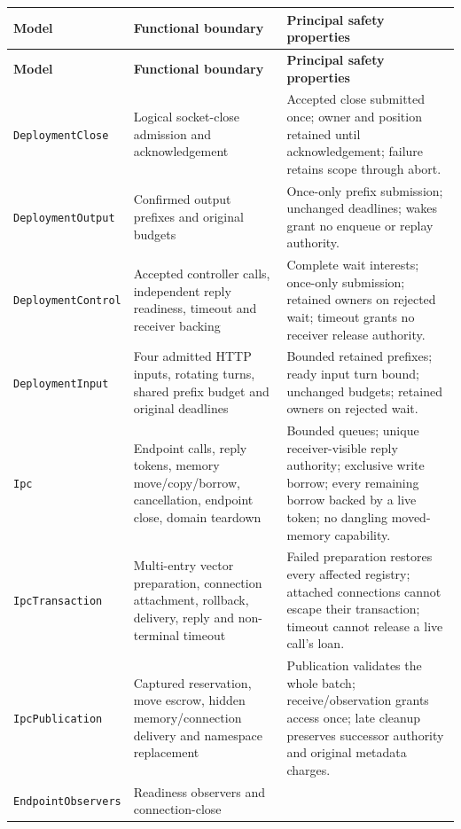 \small
\begin{longtable}{|p{}|p{}|p{}|}
\hline
\textbf{Model} & \textbf{Functional boundary} & \textbf{Principal safety properties} \\
\hline
\endfirsthead
\hline
\textbf{Model} & \textbf{Functional boundary} & \textbf{Principal safety properties} \\
\hline
\endhead
\texttt{DeploymentClose} & Logical socket-close admission and
    acknowledgement & Accepted close submitted once; owner and position retained
    until acknowledgement; failure retains scope through abort. \\
\hline
\texttt{DeploymentOutput} & Confirmed output prefixes and original
    budgets & Once-only prefix submission; unchanged deadlines; wakes grant no
    enqueue or replay authority. \\
\hline
\texttt{DeploymentControl} & Accepted controller calls, independent
    reply readiness, timeout and receiver backing & Complete wait interests;
    once-only submission; retained owners on rejected wait; timeout grants no
    receiver release authority. \\
\hline
\texttt{DeploymentInput} & Four admitted HTTP inputs, rotating
    turns, shared prefix budget and original deadlines & Bounded retained
    prefixes; ready input turn bound; unchanged budgets; retained owners on
    rejected wait. \\
\hline
\texttt{Ipc} & Endpoint calls, reply tokens, memory move/copy/borrow,
    cancellation, endpoint close, domain teardown & Bounded queues; unique
    receiver-visible reply authority; exclusive write borrow; every remaining
    borrow backed by a live token; no dangling moved-memory capability. \\
\hline
\texttt{IpcTransaction} & Multi-entry vector preparation,
    connection attachment, rollback, delivery, reply and non-terminal timeout &
    Failed preparation restores every affected registry; attached connections
    cannot escape their transaction; timeout cannot release a live call's loan. \\
\hline
\texttt{IpcPublication} & Captured reservation, move escrow,
    hidden memory/connection delivery and namespace replacement & Publication
    validates the whole batch; receive/observation grants access once; late
    cleanup preserves successor authority and original metadata charges. \\
\hline
\texttt{EndpointObservers} & Readiness observers and connection-close

\end{longtable}
